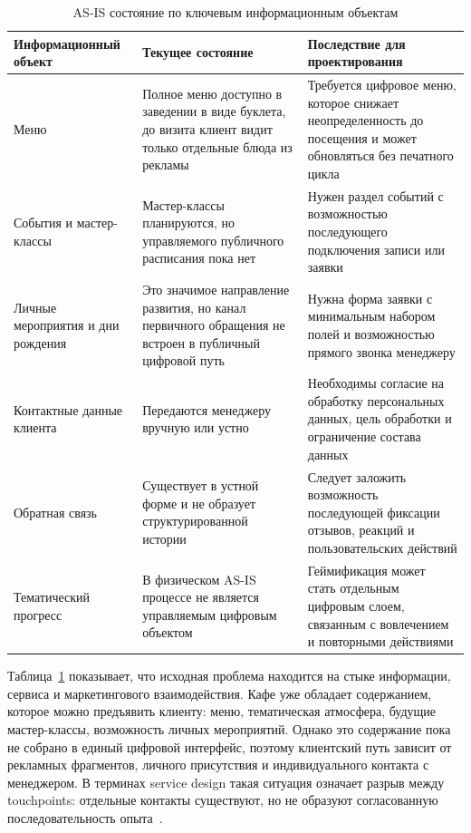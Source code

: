 \begin{table}[H]
\centering
\small
\caption{AS-IS состояние по ключевым информационным объектам}
\label{tab:v2_asis_information_objects}
\begin{tabularx}{\textwidth}{|>{\raggedright\arraybackslash}p{}|>{\raggedright\arraybackslash}p{}|>{\raggedright\arraybackslash}X|}
\hline
\textbf{Информационный объект} & \textbf{Текущее состояние} & \textbf{Последствие для проектирования} \\ \hline
Меню & Полное меню доступно в заведении в виде буклета, до визита клиент видит только отдельные блюда из рекламы & Требуется цифровое меню, которое снижает неопределенность до посещения и может обновляться без печатного цикла \\ \hline
События и мастер-классы & Мастер-классы планируются, но управляемого публичного расписания пока нет & Нужен раздел событий с возможностью последующего подключения записи или заявки \\ \hline
Личные мероприятия и дни рождения & Это значимое направление развития, но канал первичного обращения не встроен в публичный цифровой путь & Нужна форма заявки с минимальным набором полей и возможностью прямого звонка менеджеру \\ \hline
Контактные данные клиента & Передаются менеджеру вручную или устно & Необходимы согласие на обработку персональных данных, цель обработки и ограничение состава данных~\cite{fz152,moric2024} \\ \hline
Обратная связь & Существует в устной форме и не образует структурированной истории & Следует заложить возможность последующей фиксации отзывов, реакций и пользовательских действий \\ \hline
Тематический прогресс & В физическом AS-IS процессе не является управляемым цифровым объектом & Геймификация может стать отдельным цифровым слоем, связанным с вовлечением и повторными действиями \\ \hline
\end{tabularx}
\normalsize
\end{table}

Таблица~\ref{tab:v2_asis_information_objects} показывает, что исходная проблема находится на стыке информации, сервиса и маркетингового взаимодействия. Кафе уже обладает содержанием, которое можно предъявить клиенту: меню, тематическая атмосфера, будущие мастер-классы, возможность личных мероприятий. Однако это содержание пока не собрано в единый цифровой интерфейс, поэтому клиентский путь зависит от рекламных фрагментов, личного присутствия и индивидуального контакта с менеджером. В терминах service design такая ситуация означает разрыв между touchpoints: отдельные контакты существуют, но не образуют согласованную последовательность опыта~\cite{stickdorn2018,pantouvakis2022}.

